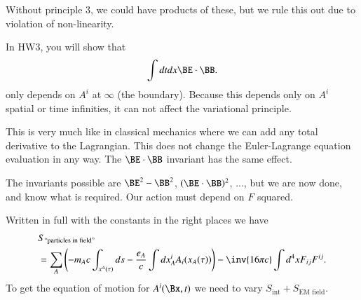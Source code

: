 Without principle 3, we could have products of these, but we rule this out due to violation of non-linearity.
%

In HW3, you will show that
%
\begin{equation}\label{eqn:relativisticElectrodynamicsL12b:350}
\int dt dx \BE \cdot \BB.
\end{equation}
%
only depends on \(A^i\) at \(\infty\) (the boundary).  Because this depends only on \(A^i\) spatial or time infinities, it can not affect the variational principle.

This is very much like in classical mechanics where we can add any total derivative to the Lagrangian.  This does not change the Euler-Lagrange equation evaluation in any way.  The \(\BE \cdot \BB\) invariant has the same effect.

The invariants possible are \(\BE^2 - \BB^2\), \((\BE \cdot \BB)^2\), ..., but we are now done, and know what is required.  Our action must depend on \(F\) squared.

Written in full with the constants in the right places we have
%
\begin{equation}\label{eqn:relativisticElectrodynamicsL12b:370}
\begin{aligned}
&S_{\text{``particles in field''}} \\
&= \sum_A \left( -m_A c \int_{x^A(\tau)} ds - \frac{e_A}{c} \int dx^i_A A_i(x_A(\tau))
\right)
- \inv{16 \pi c} \int d^4 x F_{ij} F^{ij}.
\end{aligned}
\end{equation}
%
To get the equation of motion for \(A^i(\Bx, t)\) we need to vary \(S_{\text{int}} + S_{\text{EM field}}\).
%
